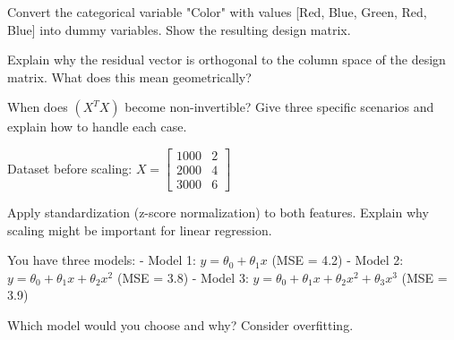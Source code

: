 \documentclass{article}
\newcounter{exercise}
\begin{document}
\begin{tcolorbox}[colback=gray!5!white,colframe=gray!75!black,title=Problem \stepcounter{exercise}: Dummy Variables]

Convert the categorical variable "Color" with values [Red, Blue, Green, Red, Blue] into dummy variables. Show the resulting design matrix.
\end{tcolorbox}

\begin{tcolorbox}[colback=gray!5!white,colframe=gray!75!black,title=Problem \stepcounter{exercise}: Geometric Interpretation]

Explain why the residual vector is orthogonal to the column space of the design matrix. What does this mean geometrically?
\end{tcolorbox}

\begin{tcolorbox}[colback=gray!5!white,colframe=gray!75!black,title=Problem \stepcounter{exercise}: Non-invertible Matrix]

When does $(X^T X)$ become non-invertible? Give three specific scenarios and explain how to handle each case.
\end{tcolorbox}

\begin{tcolorbox}[colback=gray!5!white,colframe=gray!75!black,title=Problem \stepcounter{exercise}: Feature Scaling]

Dataset before scaling: $X = \begin{bmatrix} 1000 & 2 \\ 2000 & 4 \\ 3000 & 6 \end{bmatrix}$

Apply standardization (z-score normalization) to both features. Explain why scaling might be important for linear regression.
\end{tcolorbox}

\begin{tcolorbox}[colback=gray!5!white,colframe=gray!75!black,title=Problem \stepcounter{exercise}: Model Selection]

You have three models:
- Model 1: $y = \theta_0 + \theta_1 x$ (MSE = 4.2)
- Model 2: $y = \theta_0 + \theta_1 x + \theta_2 x^2$ (MSE = 3.8)  
- Model 3: $y = \theta_0 + \theta_1 x + \theta_2 x^2 + \theta_3 x^3$ (MSE = 3.9)

Which model would you choose and why? Consider overfitting.
\end{tcolorbox}
\end{document}
